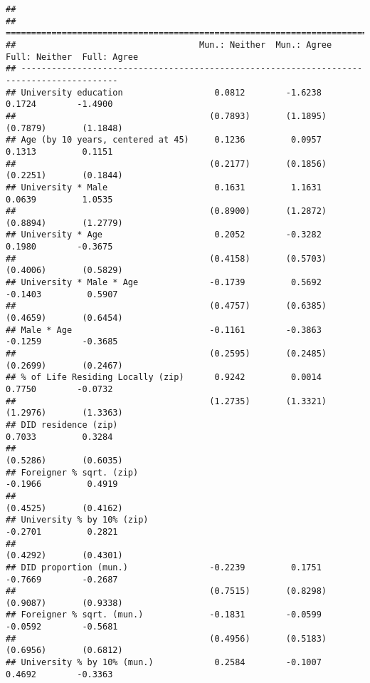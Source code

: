 \documentclass[
]{article}
\begin{document}
\begin{verbatim}
## 
## =========================================================================================
##                                    Mun.: Neither  Mun.: Agree  Full: Neither  Full: Agree
## -----------------------------------------------------------------------------------------
## University education                  0.0812        -1.6238       0.1724        -1.4900  
##                                      (0.7893)       (1.1895)     (0.7879)       (1.1848) 
## Age (by 10 years, centered at 45)     0.1236         0.0957       0.1313         0.1151  
##                                      (0.2177)       (0.1856)     (0.2251)       (0.1844) 
## University * Male                     0.1631         1.1631       0.0639         1.0535  
##                                      (0.8900)       (1.2872)     (0.8894)       (1.2779) 
## University * Age                      0.2052        -0.3282       0.1980        -0.3675  
##                                      (0.4158)       (0.5703)     (0.4006)       (0.5829) 
## University * Male * Age              -0.1739         0.5692      -0.1403         0.5907  
##                                      (0.4757)       (0.6385)     (0.4659)       (0.6454) 
## Male * Age                           -0.1161        -0.3863      -0.1259        -0.3685  
##                                      (0.2595)       (0.2485)     (0.2699)       (0.2467) 
## % of Life Residing Locally (zip)      0.9242         0.0014       0.7750        -0.0732  
##                                      (1.2735)       (1.3321)     (1.2976)       (1.3363) 
## DID residence (zip)                                               0.7033         0.3284  
##                                                                  (0.5286)       (0.6035) 
## Foreigner % sqrt. (zip)                                          -0.1966         0.4919  
##                                                                  (0.4525)       (0.4162) 
## University % by 10% (zip)                                        -0.2701         0.2821  
##                                                                  (0.4292)       (0.4301) 
## DID proportion (mun.)                -0.2239         0.1751      -0.7669        -0.2687  
##                                      (0.7515)       (0.8298)     (0.9087)       (0.9338) 
## Foreigner % sqrt. (mun.)             -0.1831        -0.0599      -0.0592        -0.5681  
##                                      (0.4956)       (0.5183)     (0.6956)       (0.6812) 
## University % by 10% (mun.)            0.2584        -0.1007       0.4692        -0.3363  

\end{verbatim}
\end{document}
